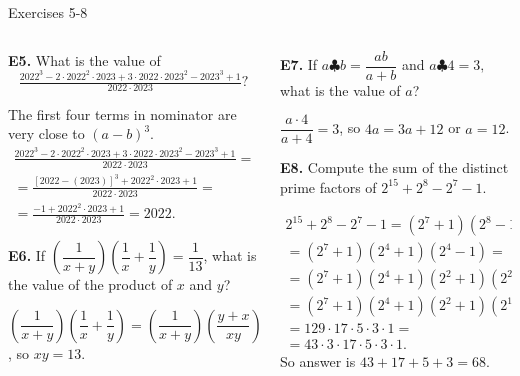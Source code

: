 \documentclass[9pt,aspectratio=169]{beamer}
\begin{document}
\begin{frame}{Exercises 5-8}
  \begin{columns}[T]
    \begin{column}{0.5\textwidth}
      \begin{problem}
        \textbf{E5.} What is the value of \[\tfrac{2022^3 - 2 \cdot 2022^2 \cdot 2023 + 3 \cdot 2022 \cdot 2023^2 - 2023^3 + 1}{2022 \cdot 2023}?\]
      \end{problem}
      The first four terms in nominator are very close to $(a-b)^3$.
      \begin{gather*}
        \tfrac{2022^3 - 2 \cdot 2022^2 \cdot 2023 + 3 \cdot 2022 \cdot 2023^2 - 2023^3 + 1}{2022 \cdot 2023} =\\
        = \frac{[2022 - (2023)]^3 + 2022^2 \cdot 2023 + 1}{2022 \cdot 2023} = \\
        = \frac{-1 + 2022^2 \cdot 2023 +1}{2022 \cdot 2023} = \boxed{2022}.
      \end{gather*}
      \begin{problem}
        \textbf{E6.} If $\left(\dfrac1{x+y}\right)\left(\dfrac1x+\dfrac1y\right)=\dfrac1{13}$, what is the value of the product of $x$ and $y$?
      \end{problem}
      $\left(\dfrac1{x+y}\right)\left(\dfrac1x+\dfrac1y\right) = \left(\dfrac1{x+y}\right)\left(\dfrac{y + x}{xy}\right) = \dfrac{1}{xy} = \dfrac{1}{13}$, so $xy = \boxed{13}$.
    \end{column}
    \begin{column}{0.5\textwidth}
      \begin{problem}
        \textbf{E7.} If $a\clubsuit b=\dfrac{ab}{a+b}$ and $a\clubsuit 4=3,$ what is the value of $a$?
      \end{problem}
      $\dfrac{a\cdot 4}{a + 4} = 3$, so $4a = 3a + 12$ or $a = \boxed{12}$.

      \begin{problem}
        \textbf{E8.} Compute the sum of the distinct prime factors of
        $2^{15} + 2^8 − 2^7 − 1$.
      \end{problem}
      \begin{gather*}
        2^{15} + 2^8 − 2^7 − 1 = (2^7 + 1)(2^8 - 1) =\\
        = (2^7+1)(2^4+1)(2^4-1) =\\
        = (2^7+1)(2^4 + 1)(2^2+1)(2^2 -1) = \\ 
        = (2^7+1)(2^4 + 1)(2^2+1)(2^1 + 1)(2^1 - 1) = \\
        = 129 \cdot 17 \cdot 5 \cdot 3 \cdot 1 = \\
        = 43 \cdot 3 \cdot 17 \cdot 5 \cdot 3 \cdot 1.
      \end{gather*}
      So answer is $43 + 17 + 5 + 3 = \boxed{68}$.
    \end{column}
  \end{columns}
\end{frame}
\end{document}
